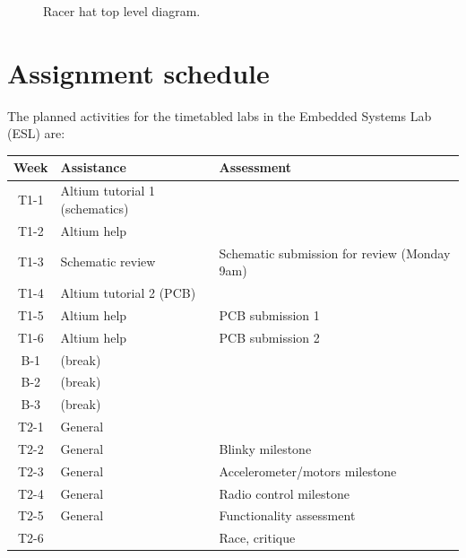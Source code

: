 \documentclass[11pt, a4paper]{article}
\begin{document}

\begin{figure}[h]
  \centering
  
  \caption{Racer hat top level diagram.}
\end{figure}


\vfill\pagebreak

\section{Assignment schedule}

The planned activities for the timetabled labs in the Embedded Systems
Lab (ESL) are:
%
\begin{flushleft}
  \begin{tabular}{ c l l }
    Week            &  Assistance  &  Assessment \\
    \hline \hline
    T1-1 & Altium tutorial 1 (schematics)  & \\
    T1-2 & Altium help      & \\
    T1-3 & Schematic review & Schematic submission for review (Monday 9am) \\
    T1-4 & Altium tutorial 2 (PCB) &          \\
    T1-5 & Altium help      & PCB submission 1    \\
    T1-6 & Altium help      & PCB submission 2    \\
    \hline
    B-1  & (break)          &                   \\
    B-2  & (break)          &                   \\
    B-3  & (break)          &                   \\
    \hline
    T2-1 & General          &                   \\
    T2-2 & General          & Blinky milestone            \\
    T2-3 & General          & Accelerometer/motors milestone        \\
    T2-4 & General          & Radio control milestone     \\
    T2-5 & General          & Functionality assessment     \\
    T2-6 &                  & Race, critique  \\
  \end{tabular}
\end{flushleft}
\end{document}
